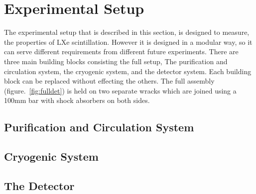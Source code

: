 \section{Experimental Setup}
\label{expSetup}
The experimental setup that is described in this section, is designed to measure, the properties of LXe scintillation. However it is designed in a modular way, so it can serve different requirements from different future experiments. There are three main building blocks consisting the full setup, The purification and circulation system, the cryogenic system, and the detector system. Each building block can be replaced without effecting the others. The full assembly (figure.~\ref{fig:fulldet}) is held on two separate wracks which are joined using a 100mm bar with shock absorbers on both sides.  

\subsection{Purification and Circulation System}
\label{subsec:purification}


\subsection{Cryogenic System}
\label{subsec:cryo}

\subsection{The Detector}
\label{subsec:det}
